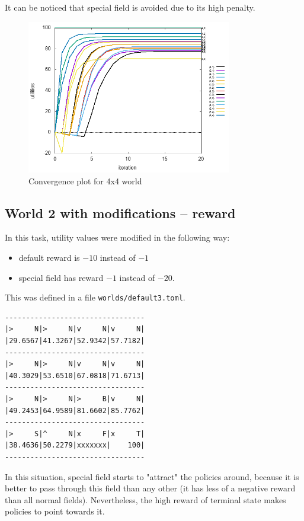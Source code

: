 \documentclass[12pt,a4paper]{article} %
\begin{document}
It can be noticed that special field is avoided due to its high penalty.

\begin{figure}[H]
\centering
	\includegraphics[width=0.8\textwidth]{../results/default2.png}
	\caption{Convergence plot for 4x4 world}
	\label{q2}
\end{figure}

\subsection{World 2 with modifications -- reward}

In this task, utility values were modified in the following way:
\begin{itemize}
	\item default reward is $-10$ instead of $-1$
	\item special field has reward $-1$ instead of $-20$.
\end{itemize}
This was defined in a file \texttt{worlds/default3.toml}.
\begin{lstlisting}[caption={Results of MDP utility value calculation for 4x4 world, modified reward}]
---------------------------------
|>     N|>     N|v     N|v     N|
|29.6567|41.3267|52.9342|57.7182|
---------------------------------
|>     N|>     N|v     N|v     N|
|40.3029|53.6510|67.0818|71.6713|
---------------------------------
|>     N|>     N|>     B|v     N|
|49.2453|64.9589|81.6602|85.7762|
---------------------------------
|>     S|^     N|x     F|x     T|
|38.4636|50.2279|xxxxxxx|    100|
---------------------------------
\end{lstlisting}

In this situation, special field starts to "attract" the policies around, because it is better to pass through this field than any other (it has less of a negative reward than all normal fields). Nevertheless, the high reward of terminal state makes policies to point towards it.
\end{document}
